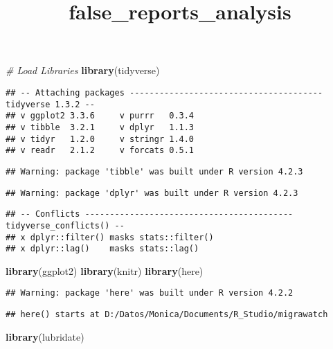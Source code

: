 \documentclass[
]{article}
\title{false\_reports\_analysis}
\author{}
\date{\vspace{-2.5em}}
\newenvironment{Shaded}{\begin{snugshade}}{\end{snugshade}}
\newcommand{\CommentTok}[1]{\textcolor[rgb]{0.56,0.35,0.01}{\textit{#1}}}
\newcommand{\FunctionTok}[1]{\textcolor[rgb]{0.13,0.29,0.53}{\textbf{#1}}}
\newcommand{\NormalTok}[1]{#1}
\begin{document}
\maketitle

\begin{Shaded}
\begin{Highlighting}[]
\CommentTok{\# Load Libraries}
\FunctionTok{library}\NormalTok{(tidyverse)}
\end{Highlighting}
\end{Shaded}

\begin{verbatim}
## -- Attaching packages --------------------------------------- tidyverse 1.3.2 --
## v ggplot2 3.3.6     v purrr   0.3.4
## v tibble  3.2.1     v dplyr   1.1.3
## v tidyr   1.2.0     v stringr 1.4.0
## v readr   2.1.2     v forcats 0.5.1
\end{verbatim}

\begin{verbatim}
## Warning: package 'tibble' was built under R version 4.2.3
\end{verbatim}

\begin{verbatim}
## Warning: package 'dplyr' was built under R version 4.2.3
\end{verbatim}

\begin{verbatim}
## -- Conflicts ------------------------------------------ tidyverse_conflicts() --
## x dplyr::filter() masks stats::filter()
## x dplyr::lag()    masks stats::lag()
\end{verbatim}

\begin{Shaded}
\begin{Highlighting}[]
\FunctionTok{library}\NormalTok{(ggplot2)}
\FunctionTok{library}\NormalTok{(knitr)}
\FunctionTok{library}\NormalTok{(here)}
\end{Highlighting}
\end{Shaded}

\begin{verbatim}
## Warning: package 'here' was built under R version 4.2.2
\end{verbatim}

\begin{verbatim}
## here() starts at D:/Datos/Monica/Documents/R_Studio/migrawatch
\end{verbatim}

\begin{Shaded}
\begin{Highlighting}[]
\FunctionTok{library}\NormalTok{(lubridate)}
\end{Highlighting}
\end{Shaded}
\end{document}

